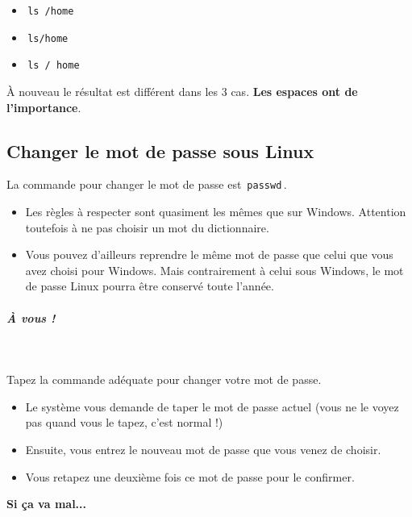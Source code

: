 \documentclass[11pt,a4paper]{article}
\begin{document}
            \par
        
					\begin{itemize}
				
			\item \,\verb|ls /home|\,
			\item \,\verb|ls/home|\,
			\item \,\verb|ls / home|\,
					\end{itemize}
				
					\`A nouveau le r\'esultat est diff\'erent dans les 3 cas.
					\textbf{Les espaces ont de l'importance}.
				
            \par
        \subsection{Changer le mot de passe sous Linux}
					La commande pour changer le mot de passe est \,\verb|passwd|\,.
				
            \par
        
					\begin{itemize}
				
			\item Les r\`egles \`a respecter sont quasiment les m\^emes que sur Windows. Attention toutefois \`a ne pas choisir un mot du dictionnaire.
			\item 
					  Vous pouvez d'ailleurs reprendre le m\^eme mot de passe que celui que vous avez choisi pour Windows.
					  Mais contrairement \`a celui sous Windows, le mot de passe Linux pourra \^etre conserv\'e toute l'ann\'ee.
					
					\end{itemize}
				
			
		\subparagraph{\`A vous !} 
		
					\textcolor{white}{.} \par
				
            \par
        
					Tapez la commande ad\'equate pour changer votre mot de passe.
				
            \par
        
					\begin{itemize}
				
			\item Le syst\`eme vous demande de taper le mot de passe actuel (vous ne le voyez pas quand vous le tapez, c'est normal !)
			\item Ensuite, vous entrez le nouveau mot de passe que vous venez de choisir.
			\item Vous retapez une deuxi\`eme fois ce mot de passe pour le confirmer.
					\end{itemize}
				\textbf{Si \c ca va mal...}
            \par
        
\end{document}
